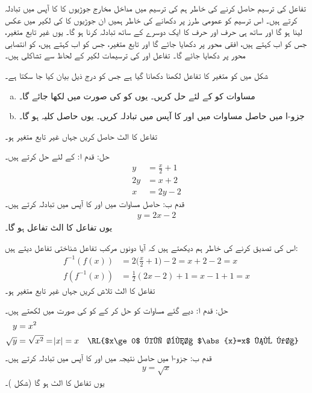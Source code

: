 تفاعل  کی ترسیم حاصل کرنے کی خاطر ہم  کی ترسیم میں مداخل مخارج جوڑیوں کا  کا آپس میں تبادلہ  کرتے ہیں۔ اس ترسیم کو عمومی طرز پر دکھانے کی خاطر ہمیں ان جوڑیوں کا  کی لکیر  میں عکس لینا ہو گا اور ساتھ ہی  حرف  اور حرف  کا ایک دوسرے کے ساتھ تبادلہ کرنا ہو گا۔ یوں غیر تابع متغیر، جس کو اب  کہتے ہیں، افقی محور پر دکھایا جائے گا اور تابع متغیر، جس کو اب  کہتے ہیں، کو انتصابی محور پر دکھایا جائے گا۔ تفاعل  اور  کی ترسیمات لکیر  کے لحاظ سے تشاکلی ہیں۔

شکل  میں  کو متغیر  کا تفاعل لکھنا دکھانا گیا ہے جس کو درج ذیل بیان کیا جا سکتا ہے۔
\begin{enumerate}[a.]
\item
مساوات  کو   کے لئے حل کریں۔ یوں  کو  کی صورت میں لکھا جائے گا۔
\item
جزو-ا میں حاصل مساوات میں  اور  کا آپس میں تبادلہ کریں۔ یوں حاصل کلیہ  ہو گا۔
\end{enumerate} 

تفاعل  کا الٹ حاصل کریں جہاں غیر تابع متغیر  ہو۔

حل:\quad
قدم ا:\quad
{} کے لئے حل کرتے ہیں۔
\begin{align*}
y&=\frac{x}{2}+1\\
2y&=x+2\\
x&=2y-2
\end{align*}
قدم ب:\quad
حاصل مساوات میں  اور  کا آپس میں تبادلہ کرتے ہیں۔
\begin{align*}
y=2x-2
\end{align*}
یوں تفاعل  کا الٹ تفاعل  ہو گا۔

اس کی تصدیق کرنے کی خاطر ہم دیکھتے ہیں کہ آیا دونوں مرکب تفاعل شناختی تفاعل دیتے ہیں:
\begin{align*}
f^{-1}(f(x))&=2\big(\frac{x}{2}+1\big)-2=x+2-2=x\\
f(f^{-1}(x))&=\frac{1}{2}(2x-2)+1=x-1+1=x
\end{align*}
تفاعل  کا الٹ تلاش کریں جہاں غیر تابع متغیر  ہو۔

حل:\quad
قدم ا:\quad
دیے گئے مساوات کو حل کر کے  کو  کی صورت میں لکھتے ہیں۔
\begin{align*}
y&=x^2\\
\sqrt{y}&=\sqrt{x^2}=\abs{x}=x&&\text{\RL{$x\ge 0$ کی بنا $\abs{x}=x$ ہو گا}}
\end{align*}
قدم ب:\quad
جزو-ا میں حاصل نتیجہ میں  اور  کا آپس میں تبادلہ کرتے ہیں۔
\begin{align*}
y=\sqrt{x}
\end{align*}
یوں تفاعل  کا الٹ  ہو گا (شکل )۔

